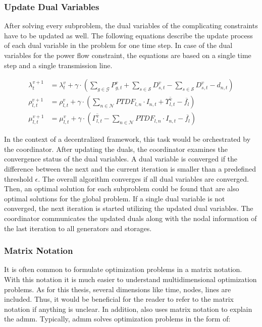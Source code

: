 \subsubsection*{Update Dual Variables}

After solving every subproblem, the dual variables of the complicating constraints have to be updated as well. The following equations describe the update process of each dual variable in the problem for one time step. In case of the dual variables for the power flow constraint, the equations are based on a single time step and a single transmission line.

\begin{subequations}
	\begin{align}
		\lambda_t^{v+1} &= \lambda_t^{v} + \gamma \cdot (\sum_{g\in\mathcal{G}}P_{g,t}^{v} + \sum_{s\in\mathcal{S}}D_{s,t}^{v} - \sum_{s\in\mathcal{S}}D_{s,t}^{v} - d_{n,t}) \label{eq:update-duals:lambda} \\
		\rho_{l,t}^{v+1} &= \rho_{l,t}^{v} + \gamma \cdot (\sum_{n \in \mathcal{N}} PTDF_{l,n} \cdot I_{n,t} + \overline{\Upsilon_{l,t}^v} - \overline{f_l}) \\
		\mu_{l,t}^{v+1} &= \mu_{l,t}^{v} + \gamma \cdot (\overline{\Gamma_{l,t}^v} - \sum_{n \in \mathcal{N}} PTDF_{l,n} \cdot I_{n,t} - \overline{f_l}) \label{eq:update-duals:mu}
	\end{align}
\end{subequations}

In the context of a decentralized framework, this task would be orchestrated by the coordinator. After updating the duals, the coordinator examines the convergence status of the dual variables. A dual variable is converged if the difference between the next and the current iteration is smaller than a predefined threshold $\epsilon$. The overall algorithm converges if all dual variables are converged. Then, an optimal solution for each subproblem could be found that are also optimal solutions for the global problem. If a single dual variable is not converged, the next iteration is started utilizing the updated dual variables. The coordinator communicates the updated duals along with the nodal information of the last iteration to all generators and storages. 


\subsubsection{Matrix Notation}
\label{sec:app:matrix}

It is often common to formulate optimization problems in a matrix notation. With this notation it is much easier to understand multidimensional optimization problems. As for this thesis, several dimensions like time, nodes, lines are included. Thus, it would be beneficial for the reader to refer to the matrix notation if anything is unclear. In addition, \citet{boyd2010} also uses matrix notation to explain the \gls{admm}. Typically, \gls{admm} solves optimization problems in the form of:

